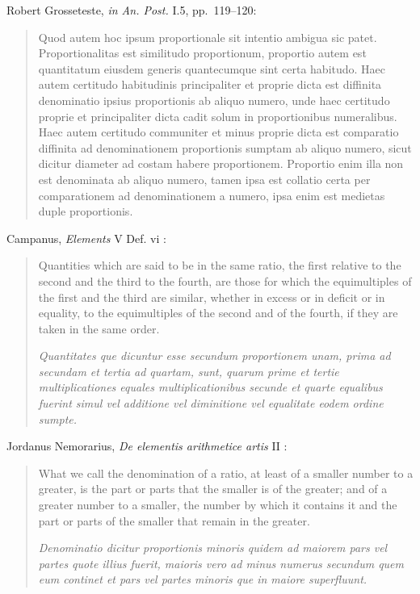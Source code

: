 \documentclass{article}
\begin{document}
Robert Grosseteste, {\em in An. Post.} I.5, pp.~119--120:

\begin{quote}
Quod autem hoc ipsum proportionale sit intentio ambigua sic patet. Proportionalitas est similitudo proportionum, proportio autem est quantitatum eiusdem generis quantecumque sint certa habitudo. Haec autem certitudo habitudinis principaliter et proprie dicta est diffinita denominatio ipsius proportionis ab aliquo numero, unde haec certitudo proprie et principaliter dicta cadit solum in proportionibus numeralibus. Haec autem certitudo communiter et minus proprie dicta est comparatio diffinita ad denominationem proportionis sumptam ab aliquo numero, sicut dicitur diameter ad costam habere proportionem. Proportio enim illa non est denominata ab aliquo numero, tamen ipsa est collatio certa per comparationem ad denominationem
a numero, ipsa enim est medietas duple proportionis.
\end{quote}











Campanus, {\em Elements} V Def. vi \cite[p.~696]{rommevaux}:

\begin{quote}
Quantities which are said to be in the same ratio, the first relative to the second and the
third to the fourth, are those for which the equimultiples of the first and the third are
similar, whether in excess or in deficit or in equality, to the equimultiples of the second
and of the fourth, if they are taken in the same order.

{\em Quantitates que dicuntur esse secundum proportionem unam, prima ad secundam et tertia ad quartam,
sunt, quarum prime et tertie multiplicationes equales multiplicationibus secunde et quarte equalibus
fuerint simul vel additione vel diminitione vel equalitate eodem ordine sumpte.}
\end{quote}

Jordanus Nemorarius, {\em De elementis arithmetice artis} II \cite[p.~697]{rommevaux}:

\begin{quote}
What we call the denomination of a ratio, at least of a smaller number to a greater, is the
part or parts that the smaller is of the greater; and of a greater number to a smaller, the
number by which it contains it and the part or parts of the smaller that remain in the
greater.

{\em Denominatio dicitur proportionis minoris quidem ad maiorem pars vel partes quote illius fuerit,
maioris vero ad minus numerus secundum quem eum continet et pars vel partes minoris que in maiore
superfluunt.}
\end{quote}
\end{document}
